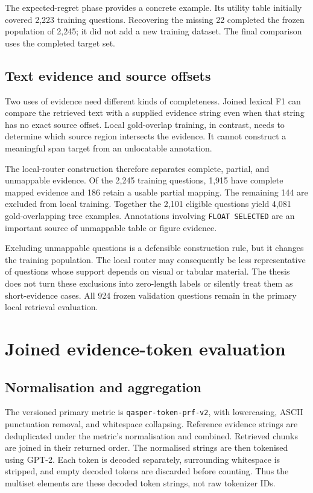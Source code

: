 The expected-regret phase provides a concrete example. Its utility
table initially covered 2,223 training questions. Recovering the missing
22 completed the frozen population of 2,245; it did not add a new
training dataset. The final comparison uses the completed target set.

\subsection{Text evidence and source offsets}
Two uses of evidence need different kinds of completeness. Joined
lexical F1 can compare the retrieved text with a supplied evidence string
even when that string has no exact source offset. Local gold-overlap
training, in contrast, needs to determine which source region intersects
the evidence. It cannot construct a meaningful span target from an
unlocatable annotation.

The local-router construction therefore separates complete, partial,
and unmappable evidence. Of the 2,245 training questions, 1,915 have
complete mapped evidence and 186 retain a usable partial mapping. The
remaining 144 are excluded from local training. Together the 2,101
eligible questions yield 4,081 gold-overlapping tree examples.
Annotations involving \texttt{FLOAT SELECTED} are an important source
of unmappable table or figure evidence.

Excluding unmappable questions is a defensible construction rule, but
it changes the training population. The local router may consequently
be less representative of questions whose support depends on visual
or tabular material. The thesis does not turn these exclusions into
zero-length labels or silently treat them as short-evidence cases.
All 924 frozen validation questions remain in the primary local
retrieval evaluation.

\section{Joined evidence-token evaluation}
\subsection{Normalisation and aggregation}
The versioned primary metric is \texttt{qasper-token-prf-v2}, with
lowercasing, ASCII punctuation removal, and whitespace collapsing. Reference
evidence strings are deduplicated under the metric's normalisation and
combined. Retrieved chunks are joined in their returned order. The
normalised strings are then tokenised using GPT-2. Each token is
decoded separately, surrounding whitespace is stripped, and empty
decoded tokens are discarded before counting. Thus the multiset
elements are these decoded token strings, not raw tokenizer IDs.

